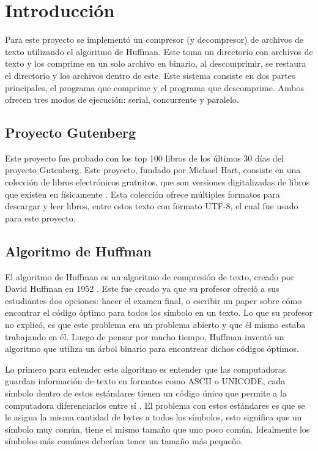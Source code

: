 \documentclass{report}
\begin{document}


\tableofcontents

\chapter{Introducción}\label{intro}

Para este proyecto se implementó un compresor (y decompresor) de archivos de texto utilizando el algoritmo de Huffman.
Este toma un directorio con archivos de texto y los comprime en un solo archivo en binario, al descomprimir, se restaura el directorio y los archivos dentro de este.
Este sistema consiste en dos partes principales,  el programa que comprime y el programa que descomprime.
Ambos ofrecen tres modos de ejecución: serial, concurrente y paralelo.

\section {Proyecto Gutenberg}

Este proyecto fue probado con los top 100 libros de los últimos 30 días del proyecto Gutenberg.
Este proyecto, fundado por Michael  Hart, consiste en una colección de libros electrónicos gratuitos, que son versiones digitalizadas de libros que existen en físicamente \cite{ref0}.
Esta colección ofrece múltiples formatos para descargar y leer libros, entre estos texto con formato UTF-8, el cual fue usado para este proyecto.

\section{Algoritmo de Huffman}

El algoritmo de Huffman es un algoritmo de compresión de texto, creado por David Huffman en 1952 \cite{ref2}.
Este fue creado ya que su profesor ofreció a sus estudiantes dos opciones: hacer el examen final, o escribir un paper sobre cómo encontrar el código óptimo para todos los símbolo en un texto.
Lo que su profesor no explicó,  es que este problema era un problema abierto y que él mismo estaba trabajando en él.
Luego de pensar por mucho tiempo,  Huffman inventó un algoritmo que utiliza un árbol binario para encontrear dichos códigos óptimos. 


Lo primero para entender este algoritmo es entender que las computadoras guardan información de texto en formatos como ASCII o UNICODE, cada símbolo dentro de estos estándares tienen un código único que permite a la computadora diferenciarlos entre sí \cite{ref3}.
El problema con estos estándares es que se le asigna la misma cantidad de bytes a todos los símbolos,  esto significa que un símbolo muy común, tiene el mismo tamaño que uno poco común.
Idealmente los símbolos más comúnes deberían tener un tamaño más pequeño. 
\end{document}
